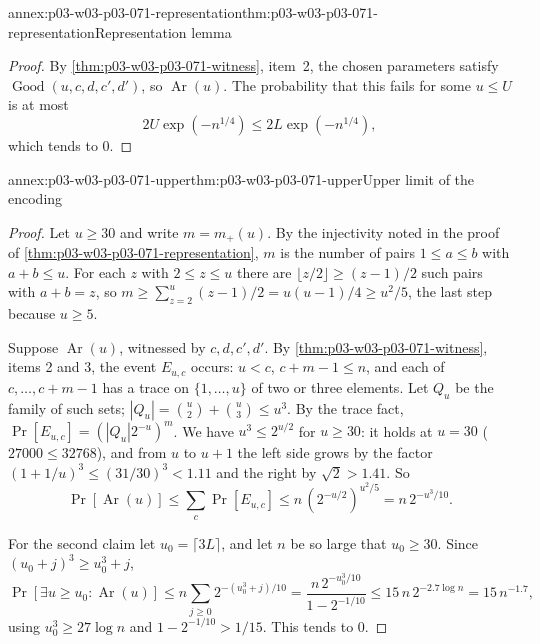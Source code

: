\begin{annexitem}{annex:p03-w03-p03-071-representation}{thm:p03-w03-p03-071-representation}{Representation lemma}
\begin{proof}
By \cref{thm:p03-w03-p03-071-witness}, item~2, the chosen parameters satisfy
\(\operatorname{Good}(u,c,d,c',d')\), so \(\operatorname{Ar}(u)\).  The
probability that this fails for some \(u\leq U\) is at most
\[
 2U\exp(-n^{1/4})\leq2L\exp(-n^{1/4}),
\]
which tends to \(0\).
\end{proof}
\end{annexitem}

\begin{annexitem}{annex:p03-w03-p03-071-upper}{thm:p03-w03-p03-071-upper}{Upper limit of the encoding}
\begin{proof}
Let \(u\geq30\) and write \(m=m_+(u)\).  By the injectivity noted in the
proof of \cref{thm:p03-w03-p03-071-representation}, \(m\) is the number of
pairs \(1\leq a\leq b\) with \(a+b\leq u\).  For each \(z\) with
\(2\leq z\leq u\) there are \(\lfloor z/2\rfloor\geq(z-1)/2\) such pairs with
\(a+b=z\), so \(m\geq\sum_{z=2}^{u}(z-1)/2=u(u-1)/4\geq u^2/5\), the last step
because \(u\geq5\).

Suppose \(\operatorname{Ar}(u)\), witnessed by \(c,d,c',d'\).  By
\cref{thm:p03-w03-p03-071-witness}, items 2 and 3, the event \(E_{u,c}\)
occurs: \(u<c\), \(c+m-1\leq n\), and each of \(c,\ldots,c+m-1\) has a trace
on \(\{1,\ldots,u\}\) of two or three elements.  Let \(Q_u\) be the family
of such sets; \(|Q_u|=\binom u2+\binom u3\leq u^3\).  By the trace fact,
\(\Pr[E_{u,c}]=(|Q_u|2^{-u})^m\).  We have \(u^3\leq2^{u/2}\) for
\(u\geq30\): it holds at \(u=30\) (\(27000\leq32768\)), and from \(u\) to
\(u+1\) the left side grows by the factor \((1+1/u)^3\leq(31/30)^3<1.11\)
and the right by \(\sqrt2>1.41\).  So
\[
  \Pr[\operatorname{Ar}(u)]\leq\sum_{c}\Pr[E_{u,c}]
  \leq n\,(2^{-u/2})^{u^2/5}=n\,2^{-u^3/10}.
\]

For the second claim let \(u_0=\lceil3L\rceil\), and let \(n\) be so large
that \(u_0\geq30\).  Since \((u_0+j)^3\geq u_0^3+j\),
\[
  \Pr[\exists u\geq u_0:\operatorname{Ar}(u)]
  \leq n\sum_{j\geq0}2^{-(u_0^3+j)/10}
  =\frac{n\,2^{-u_0^3/10}}{1-2^{-1/10}}\leq15\,n\,2^{-2.7\log n}
  =15\,n^{-1.7},
\]
using \(u_0^3\geq27\log n\) and \(1-2^{-1/10}>1/15\).  This tends to \(0\).
\end{proof}
\end{annexitem}

